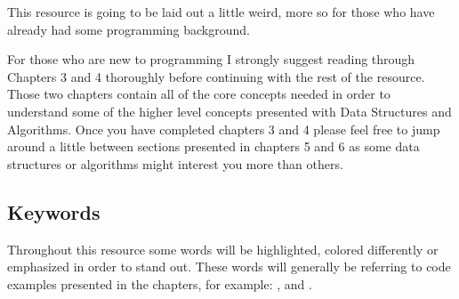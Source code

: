 This resource is going to be laid out a little weird, more so for those who have already had some programming background.
\par

For those who are new to programming I strongly suggest reading through Chapters 3 and 4 thoroughly before continuing with the
rest of the resource.
Those two chapters contain all of the core concepts needed in order to understand some of the higher level concepts
presented with Data Structures and Algorithms.
Once you have completed chapters 3 and 4 please feel free to jump around a little between sections presented in chapters 5 and 6 as
some data structures or algorithms might interest you more than others.

\subsection{Keywords}

Throughout this resource some words will be highlighted, colored differently or emphasized in order to stand out.
These words will generally be referring to code examples presented in the chapters, for example:
,  and .
